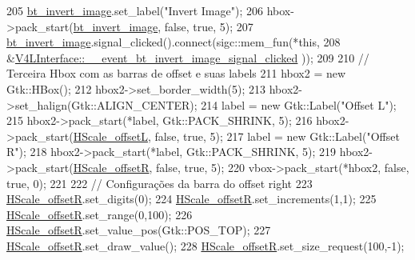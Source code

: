 \begin{DoxyCode}
205         \hyperlink{class_v_s_s_s___g_u_i_1_1_v4_l_interface_abf5daa6d389807d518f37573d99593b4}{bt\_invert\_image}.set\_label(\textcolor{stringliteral}{"Invert Image"});
206         hbox->pack\_start(\hyperlink{class_v_s_s_s___g_u_i_1_1_v4_l_interface_abf5daa6d389807d518f37573d99593b4}{bt\_invert\_image}, \textcolor{keyword}{false}, \textcolor{keyword}{true}, 5);
207         \hyperlink{class_v_s_s_s___g_u_i_1_1_v4_l_interface_abf5daa6d389807d518f37573d99593b4}{bt\_invert\_image}.signal\_clicked().connect(sigc::mem\_fun(*\textcolor{keyword}{this},
208         &\hyperlink{class_v_s_s_s___g_u_i_1_1_v4_l_interface_a624b2e48483cbf4fa8af562123f68b26}{V4LInterface::\_\_event\_bt\_invert\_image\_signal\_clicked}
      ));
209 
210         \textcolor{comment}{// Terceira Hbox com as barras de offset e suas labels}
211         hbox2 = \textcolor{keyword}{new} Gtk::HBox();
212         hbox2->set\_border\_width(5);
213         hbox2->set\_halign(Gtk::ALIGN\_CENTER);
214         label = \textcolor{keyword}{new} Gtk::Label(\textcolor{stringliteral}{"Offset L"});
215         hbox2->pack\_start(*label, Gtk::PACK\_SHRINK, 5);
216         hbox2->pack\_start(\hyperlink{class_v_s_s_s___g_u_i_1_1_v4_l_interface_a7261b87cb8ad1293c79003c48c99558a}{HScale\_offsetL}, \textcolor{keyword}{false}, \textcolor{keyword}{true}, 5);
217         label = \textcolor{keyword}{new} Gtk::Label(\textcolor{stringliteral}{"Offset R"});
218         hbox2->pack\_start(*label, Gtk::PACK\_SHRINK, 5);
219         hbox2->pack\_start(\hyperlink{class_v_s_s_s___g_u_i_1_1_v4_l_interface_a50fa202e4b9ec95b2c009a324aea10fb}{HScale\_offsetR}, \textcolor{keyword}{false}, \textcolor{keyword}{true}, 5);
220         vbox->pack\_start(*hbox2, \textcolor{keyword}{false}, \textcolor{keyword}{true}, 0);
221 
222         \textcolor{comment}{// Configurações da barra do offset right}
223         \hyperlink{class_v_s_s_s___g_u_i_1_1_v4_l_interface_a50fa202e4b9ec95b2c009a324aea10fb}{HScale\_offsetR}.set\_digits(0);
224         \hyperlink{class_v_s_s_s___g_u_i_1_1_v4_l_interface_a50fa202e4b9ec95b2c009a324aea10fb}{HScale\_offsetR}.set\_increments(1,1);
225         \hyperlink{class_v_s_s_s___g_u_i_1_1_v4_l_interface_a50fa202e4b9ec95b2c009a324aea10fb}{HScale\_offsetR}.set\_range(0,100);
226         \hyperlink{class_v_s_s_s___g_u_i_1_1_v4_l_interface_a50fa202e4b9ec95b2c009a324aea10fb}{HScale\_offsetR}.set\_value\_pos(Gtk::POS\_TOP);
227         \hyperlink{class_v_s_s_s___g_u_i_1_1_v4_l_interface_a50fa202e4b9ec95b2c009a324aea10fb}{HScale\_offsetR}.set\_draw\_value();
228         \hyperlink{class_v_s_s_s___g_u_i_1_1_v4_l_interface_a50fa202e4b9ec95b2c009a324aea10fb}{HScale\_offsetR}.set\_size\_request(100,-1);

\end{DoxyCode}
